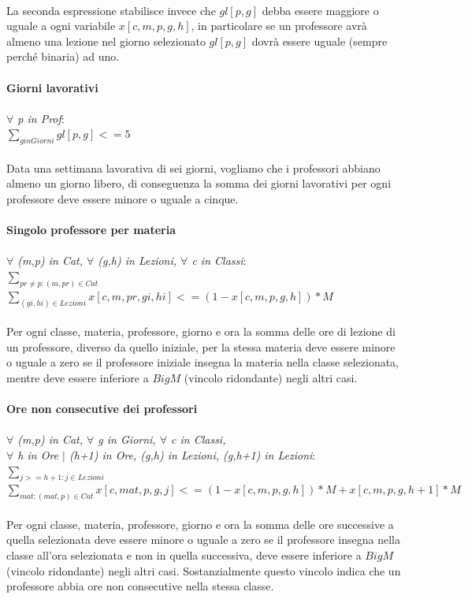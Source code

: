 \documentclass{article}
\begin{document}
\\La seconda espressione stabilisce invece che $gl[p,g]$ debba essere maggiore o uguale a ogni variabile $x[c,m,p,g,h]$, in particolare se un professore avrà almeno una lezione nel giorno selezionato $gl[p,g]$ dovrà essere uguale (sempre perché binaria) ad uno.
\\\\\textbf{Giorni lavorativi}
	\\\\\emph{$\forall$ p in Prof}:
	\\$\sum_{g in Giorni}gl[p,g] <= 5$
\\\\Data una settimana lavorativa di sei giorni, vogliamo che i professori abbiano almeno un giorno libero, di conseguenza la somma dei giorni lavorativi per ogni professore deve essere minore o uguale a cinque.
\\\\\textbf{Singolo professore per materia}
	\\\\\emph{$\forall$ (m,p) in Cat, $\forall$ (g,h) in Lezioni, $\forall$ c in Classi}:
	\\$\sum_{pr \neq p : (m,pr) \in Cat}$ $\sum_{(gi,hi) \in Lezioni}x[c,m,pr,gi,hi] <= (1-x[c,m,p,g,h])*M$
\\\\Per ogni classe, materia, professore, giorno e ora la somma delle ore di lezione di un professore, diverso da quello iniziale, per la stessa materia deve essere minore o uguale a zero se il professore iniziale insegna la materia nella classe selezionata, mentre deve essere inferiore a $Big M$ (vincolo ridondante) negli altri casi.
\\\\\textbf{Ore non consecutive dei professori}
	\\\\\emph{$\forall$ (m,p) in Cat, $\forall$ g in Giorni, $\forall$ c in Classi,
	\\$\forall$ h in Ore $\mid$ (h+1) in Ore, (g,h) in Lezioni, (g,h+1) in Lezioni}:
	\\$\sum_{j>=h+1: j \in Lezioni}$ $\sum_{mat : (mat,p) \in Cat}x[c,mat,p,g,j] <= (1-x[c,m,p,g,h])*M + x[c,m,p,g,h+1]*M$
\\\\Per ogni classe, materia, professore, giorno e ora la somma delle ore successive a quella selezionata deve essere minore o uguale a zero se il professore insegna nella classe all'ora selezionata e non in quella successiva, deve essere inferiore a $Big M$ (vincolo ridondante) negli altri casi. Sostanzialmente questo vincolo indica che un professore abbia ore non consecutive nella stessa classe.
\end{document}
